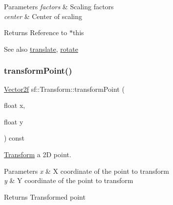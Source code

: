 \begin{DoxyParams}{Parameters}
{\em factors} & Scaling factors \\
\hline
{\em center} & Center of scaling\\
\hline
\end{DoxyParams}
\begin{DoxyReturn}{Returns}
Reference to $\ast$this
\end{DoxyReturn}
\begin{DoxySeeAlso}{See also}
\mbox{\hyperlink{classsf_1_1_transform_ab54f6c8070cc05e2afcb3145fbf4395a}{translate}}, \mbox{\hyperlink{classsf_1_1_transform_a3e548c3c9e3fb9d4bd43cf852669e555}{rotate}} \begin{DoxyVerb}\end{DoxyVerb}
 
\end{DoxySeeAlso}
\mbox{\label{classsf_1_1_transform_af2e38c3c077d28898686662558b41135}} 
\subsubsection{\texorpdfstring{transformPoint()}{transformPoint()}\hspace{0.1cm}{\footnotesize\ttfamily [1/2]}}
{\footnotesize\ttfamily \mbox{\hyperlink{classsf_1_1_vector2}{Vector2f}} sf\+::\+Transform\+::transform\+Point (\begin{DoxyParamCaption}\item[{float}]{x,  }\item[{float}]{y }\end{DoxyParamCaption}) const}



\mbox{\hyperlink{classsf_1_1_transform}{Transform}} a 2D point. 


\begin{DoxyParams}{Parameters}
{\em x} & X coordinate of the point to transform \\
\hline
{\em y} & Y coordinate of the point to transform\\
\hline
\end{DoxyParams}
\begin{DoxyReturn}{Returns}
Transformed point \begin{DoxyVerb}\end{DoxyVerb}
 
\end{DoxyReturn}
\mbox{\label{classsf_1_1_transform_ab42a0bb7a252c6d221004f6372ce5fdc}} 
